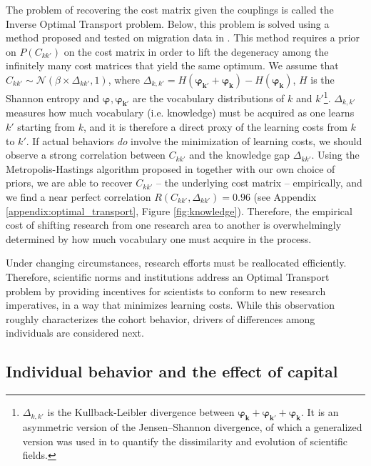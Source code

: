 \documentclass{article}
\begin{document}
The problem of recovering the cost matrix given the couplings is called the Inverse Optimal Transport problem. Below, this problem is solved using a method proposed and tested on migration data in \citealt{pmlr-v162-chiu22b}. This method requires a prior on $P(C_{kk'})$ on the cost matrix in order to lift the degeneracy among the infinitely many cost matrices that yield the same optimum. We assume that $C_{kk'}\sim \mathcal{N}(\beta \times \Delta_{kk'},1)$, where $\Delta_{k,k'}=H(\bm{\varphi_{k'}}+\bm{\varphi_k})-H(\bm{\varphi_k})$, $H$ is the Shannon entropy and $\bm{\varphi_{}},\bm{\varphi_{k'}}$ are the vocabulary distributions of $k$ and $k'$\footnote{$\Delta_{k,k'}$ is the Kullback-Leibler divergence between $\bm{\varphi_k}+\bm{\varphi_{k'}}+\bm{\varphi_k}$. It is an asymmetric version of the Jensen–Shannon divergence, of which a generalized version was used in \citealt{Dias2018} to quantify the dissimilarity and evolution of scientific fields.}. $\Delta_{k,k'}$ measures how much vocabulary (i.e. knowledge) must be acquired as one learns $k'$ starting from $k$, and it is therefore a direct proxy of the learning costs from $k$ to $k'$. If actual behaviors \textit{do} involve the minimization of learning costs, we should observe a strong correlation between $C_{kk'}$ and the knowledge gap $\Delta_{kk'}$.  Using the Metropolis-Hastings algorithm proposed in \citealt{pmlr-v162-chiu22b} together with our own choice of priors, we are able to recover $C_{kk'}$ -- the underlying cost matrix -- empirically, and we find a near perfect correlation $R(C_{kk'},\Delta_{kk'})=0.96$ (see Appendix \ref{appendix:optimal_transport}, Figure \ref{fig:knowledge}). Therefore, the empirical cost of shifting research from one research area to another is overwhelmingly determined by how much vocabulary one must acquire in the process. 

Under changing circumstances, research efforts must be reallocated efficiently. Therefore, scientific norms and institutions address an Optimal Transport problem by providing incentives for scientists to conform to new research imperatives, in a way that minimizes learning costs. While this observation roughly characterizes the cohort behavior, drivers of differences among individuals are considered next.

\subsection{\label{sec:magnitude}Individual behavior and the effect of capital}
\end{document}
